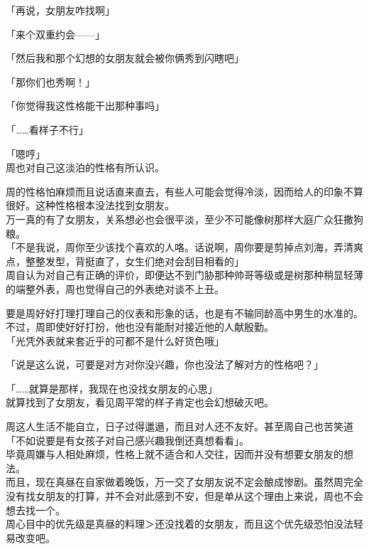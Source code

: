 「再说，女朋友咋找啊」

「来个双重约会——」

「然后我和那个幻想的女朋友就会被你俩秀到闪瞎吧」

「那你们也秀啊！」

「你觉得我这性格能干出那种事吗」

「……看样子不行」

「嗯哼」\\

周也对自己这淡泊的性格有所认识。

周的性格怕麻烦而且说话直来直去，有些人可能会觉得冷淡，因而给人的印象不算很好。这种性格根本没法找到女朋友。\\

万一真的有了女朋友，关系想必也会很平淡，至少不可能像树那样大庭广众狂撒狗粮。\\

「不是我说，周你至少该找个喜欢的人咯。话说啊，周你要是剪掉点刘海，弄清爽点，整整发型，背挺直了，女生们绝对会刮目相看的」\\

周自认为对自己有正确的评价，即便达不到门胁那种帅哥等级或是树那种稍显轻薄的端整外表，周也觉得自己的外表绝对谈不上丑。

要是周好好打理打理自己的仪表和形象的话，也是有不输同龄高中男生的水准的。\\

不过，周即使好好打扮，他也没有能耐对接近他的人献殷勤。\\

「光凭外表就来套近乎的可都不是什么好货色哦」

「说是这么说，可要是对方对你没兴趣，你也没法了解对方的性格吧？」

「……就算是那样，我现在也没找女朋友的心思」\\

就算找到了女朋友，看见周平常的样子肯定也会幻想破灭吧。

周这人生活不能自立，日子过得邋遢，而且对人还不友好。甚至周自己也苦笑道「不如说要是有女孩子对自己感兴趣我倒还真想看看」。\\

毕竟周嫌与人相处麻烦，性格上就不适合和人交往，因而并没有想要女朋友的想法。\\

而且，现在真昼在自家做着晚饭，万一交了女朋友说不定会酿成惨剧。虽然周完全没有找女朋友的打算，并不会对此感到不安，但是单从这个理由上来说，周也不会想去找一个。\\

周心目中的优先级是真昼的料理＞还没找着的女朋友，而且这个优先级恐怕没法轻易改变吧。\\

